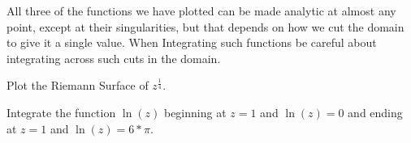 All three of the functions we have plotted can be made analytic at almost any point, except at their singularities, but that depends on how we cut the domain to give it a single value. When Integrating such functions be careful about integrating across such cuts in the domain.

\begin{problem}
Plot the Riemann Surface of $z^{\frac{1}{4}}$.
\end{problem}

\begin{problem}
Integrate the function $\ln(z)$ beginning at $z=1$ and $\ln(z)=0$ and ending at $z=1$ and $\ln(z)=6*\pi$.
\end{problem}